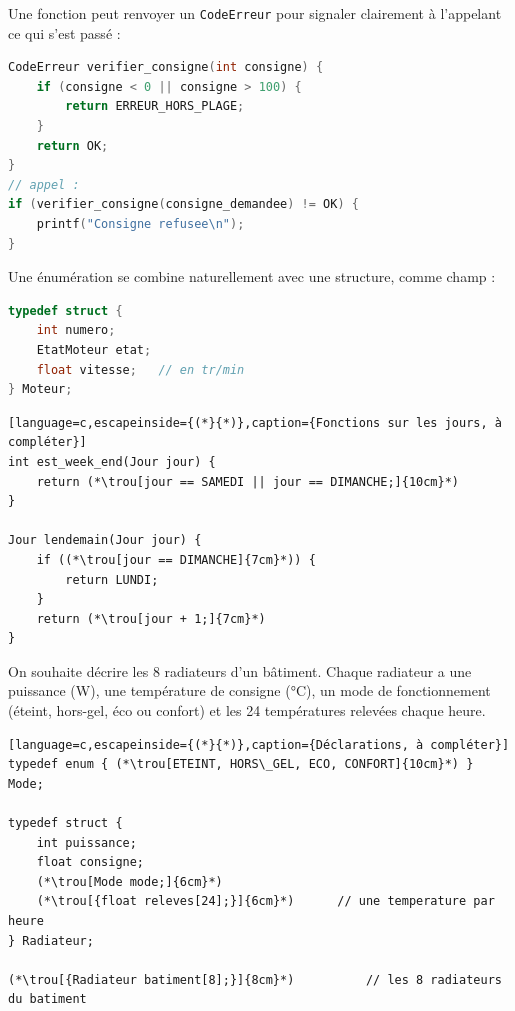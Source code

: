 Une fonction peut renvoyer un \texttt{CodeErreur} pour signaler clairement à l'appelant ce qui s'est passé :

\begin{lstlisting}[language=c,caption={Résultat d'une fonction},label=codeErreurEnum]
CodeErreur verifier_consigne(int consigne) {
    if (consigne < 0 || consigne > 100) {
        return ERREUR_HORS_PLAGE;
    }
    return OK;
}
// appel :
if (verifier_consigne(consigne_demandee) != OK) {
    printf("Consigne refusee\n");
}
\end{lstlisting}

Une énumération se combine naturellement avec une structure, comme champ :

\begin{lstlisting}[language=c,caption={Énumération en champ de structure},label=codeEnumStruct]
typedef struct {
    int numero;
    EtatMoteur etat;
    float vitesse;   // en tr/min
} Moteur;
\end{lstlisting}

\begin{UPSTIactivite}
\begin{lstlisting}[language=c,escapeinside={(*}{*)},caption={Fonctions sur les jours, à compléter}]
int est_week_end(Jour jour) {
    return (*\trou[jour == SAMEDI || jour == DIMANCHE;]{10cm}*)
}

Jour lendemain(Jour jour) {
    if ((*\trou[jour == DIMANCHE]{7cm}*)) {
        return LUNDI;
    }
    return (*\trou[jour + 1;]{7cm}*)
}
\end{lstlisting}

\end{UPSTIactivite}

\begin{UPSTIactivite}
On souhaite décrire les 8 radiateurs d'un bâtiment. Chaque radiateur a une puissance (W), une température de consigne (°C), un mode de fonctionnement (éteint, hors-gel, éco ou confort) et les 24 températures relevées chaque heure.
\begin{lstlisting}[language=c,escapeinside={(*}{*)},caption={Déclarations, à compléter}]
typedef enum { (*\trou[ETEINT, HORS\_GEL, ECO, CONFORT]{10cm}*) } Mode;

typedef struct {
    int puissance;
    float consigne;
    (*\trou[Mode mode;]{6cm}*)
    (*\trou[{float releves[24];}]{6cm}*)      // une temperature par heure
} Radiateur;

(*\trou[{Radiateur batiment[8];}]{8cm}*)          // les 8 radiateurs du batiment
\end{lstlisting}
\end{UPSTIactivite}
